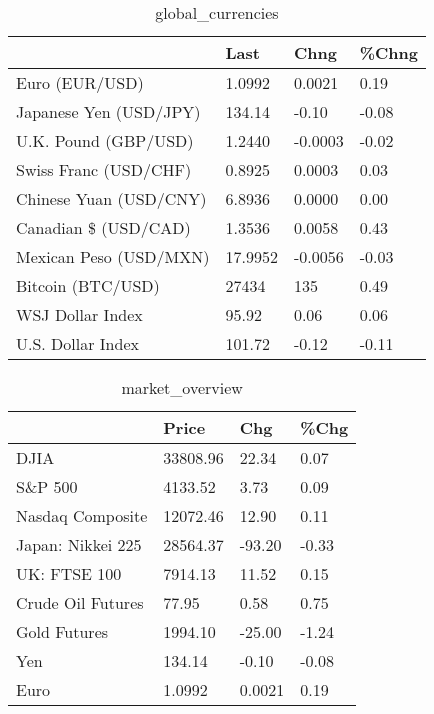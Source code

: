 \documentclass{article}%
\begin{document}
%


\begin{table}[htbp]%
\caption{global\_currencies}%
\centering%
\begin{adjustbox}{width=1\textwidth}%
\begin{tabular}{llll}
\toprule
                       &    Last &    Chng & \%Chng \\
\midrule
        Euro (EUR/USD) &  1.0992 &  0.0021 &  0.19 \\
Japanese Yen (USD/JPY) &  134.14 &   -0.10 & -0.08 \\
  U.K. Pound (GBP/USD) &  1.2440 & -0.0003 & -0.02 \\
 Swiss Franc (USD/CHF) &  0.8925 &  0.0003 &  0.03 \\
Chinese Yuan (USD/CNY) &  6.8936 &  0.0000 &  0.00 \\
  Canadian \$ (USD/CAD) &  1.3536 &  0.0058 &  0.43 \\
Mexican Peso (USD/MXN) & 17.9952 & -0.0056 & -0.03 \\
     Bitcoin (BTC/USD) &   27434 &     135 &  0.49 \\
      WSJ Dollar Index &   95.92 &    0.06 &  0.06 \\
     U.S. Dollar Index &  101.72 &   -0.12 & -0.11 \\
\bottomrule
\end{tabular}
%
\end{adjustbox}%
\end{table}

%


\begin{table}[htbp]%
\caption{market\_overview}%
\centering%
\begin{adjustbox}{width=1\textwidth}%
\begin{tabular}{llll}
\toprule
                  &    Price &    Chg &  \%Chg \\
\midrule
             DJIA & 33808.96 &  22.34 &  0.07 \\
          S\&P 500 &  4133.52 &   3.73 &  0.09 \\
 Nasdaq Composite & 12072.46 &  12.90 &  0.11 \\
Japan: Nikkei 225 & 28564.37 & -93.20 & -0.33 \\
     UK: FTSE 100 &  7914.13 &  11.52 &  0.15 \\
Crude Oil Futures &    77.95 &   0.58 &  0.75 \\
     Gold Futures &  1994.10 & -25.00 & -1.24 \\
              Yen &   134.14 &  -0.10 & -0.08 \\
             Euro &   1.0992 & 0.0021 &  0.19 \\
\bottomrule
\end{tabular}
%
\end{adjustbox}%
\end{table}

%
\end{document}
